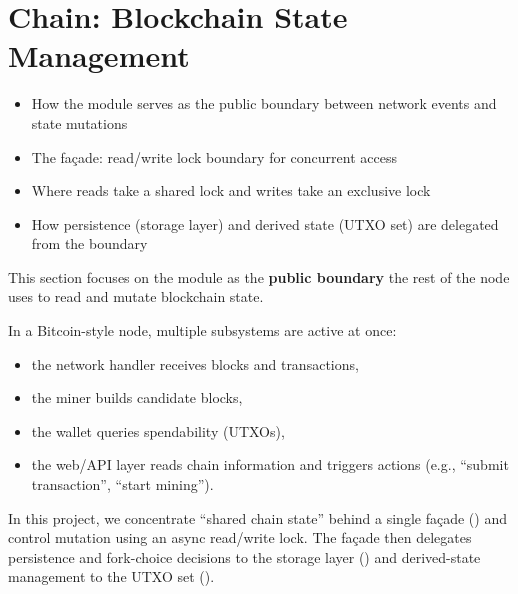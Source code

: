 \chapter{Chain: Blockchain State Management}
\label{ch:blockchain-state-management}

\begin{learnbox}
\begin{itemize}
  \item How the  module serves as the public boundary between network events and state mutations
  \item The  façade: read/write lock boundary for concurrent access
  \item Where reads take a shared lock and writes take an exclusive lock
  \item How persistence (storage layer) and derived state (UTXO set) are delegated from the boundary
\end{itemize}
\end{learnbox}

This section focuses on the  module as the \textbf{public boundary} the rest of the node uses to read and mutate blockchain state.

In a Bitcoin-style node, multiple subsystems are active at once:

\begin{itemize}
  \item the network handler receives blocks and transactions,
  \item the miner builds candidate blocks,
  \item the wallet queries spendability (UTXOs),
  \item the web/API layer reads chain information and triggers actions (e.g., ``submit transaction'', ``start mining'').
\end{itemize}

In this project, we concentrate ``shared chain state'' behind a single façade () and control mutation using an async read/write lock. The façade then delegates persistence and fork-choice decisions to the storage layer () and derived-state management to the UTXO set ().

